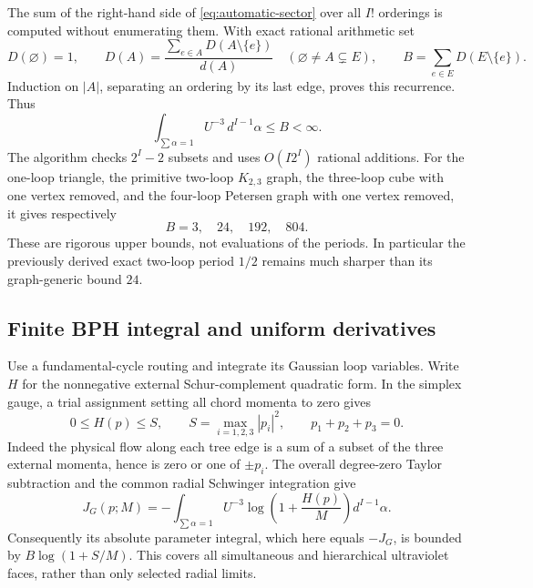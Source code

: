 The sum of the right-hand side of \eqref{eq:automatic-sector} over all
$I!$ orderings is computed without enumerating them.  With exact rational
arithmetic set
\begin{equation}
 D(\varnothing)=1,\qquad
 D(A)=\frac{\sum_{e\in A}D(A\setminus\{e\})}{d(A)}
 \quad(\varnothing\ne A\subsetneq E),\qquad
 B=\sum_{e\in E}D(E\setminus\{e\}).
 \label{eq:automatic-dp}
\end{equation}
Induction on $|A|$, separating an ordering by its last edge, proves this
recurrence.  Thus
\begin{equation}
 \int_{\sum\alpha=1}U^{-3}\,d^{I-1}\alpha\leq B<\infty.
 \label{eq:automatic-period-bound}
\end{equation}
The algorithm checks $2^I-2$ subsets and uses $O(I2^I)$ rational additions.
For the one-loop triangle, the primitive two-loop $K_{2,3}$ graph, the
three-loop cube with one vertex removed, and the four-loop Petersen graph
with one vertex removed, it gives respectively
\begin{equation}
 B=3,\quad24,\quad192,\quad804.
\end{equation}
These are rigorous upper bounds, not evaluations of the periods.  In
particular the previously derived exact two-loop period $1/2$ remains much
sharper than its graph-generic bound $24$.

\subsection{Finite BPH integral and uniform derivatives}

Use a fundamental-cycle routing and integrate its Gaussian loop variables.
Write $H$ for the nonnegative external Schur-complement quadratic form.
In the simplex gauge, a trial assignment setting all chord momenta to zero
gives
\begin{equation}
 0\leq H(p)\leq S,\qquad S=\max_{i=1,2,3}|p_i|^2,
 \qquad p_1+p_2+p_3=0.
 \label{eq:automatic-h-bound}
\end{equation}
Indeed the physical flow along each tree edge is a sum of a subset of
the three external momenta, hence is zero or one of $\pm p_i$.
The overall degree-zero Taylor subtraction and the common radial
Schwinger integration give
\begin{equation}
 J_G(p;M)=-\int_{\sum\alpha=1}U^{-3}
      \log\!\left(1+\frac{H(p)}{M}\right)d^{I-1}\alpha.
 \label{eq:automatic-primitive-bph}
\end{equation}
Consequently its absolute parameter integral, which here equals $-J_G$,
is bounded by $B\log(1+S/M)$.  This covers all simultaneous and
hierarchical ultraviolet faces, rather than only selected radial limits.

